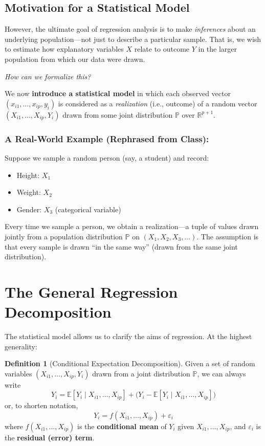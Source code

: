 \documentclass[11pt]{article}
\theoremstyle{definition}
\newtheorem{definition}{Definition}[section]
\theoremstyle{plain}
\theoremstyle{definition}
\begin{document}
\subsection{Motivation for a Statistical Model}

However, the ultimate goal of regression analysis is to make \emph{inferences} about an underlying population—not just to describe a particular sample. That is, we wish to estimate how explanatory variables $X$ relate to outcome $Y$ in the larger population from which our data were drawn.

\vspace{1em}
\textit{How can we formalize this?}

We now \textbf{introduce a statistical model} in which each observed vector $(x_{i1},\ldots,x_{ip}, y_i)$ is considered as a \emph{realization} (i.e., outcome) of a random vector $(X_{i1},\ldots,X_{ip}, Y_i)$ drawn from some joint distribution $\mathbb{P}$ over $\mathbb{R}^{p+1}$.

\subsubsection*{A Real-World Example (Rephrased from Class):}

Suppose we sample a random person (say, a student) and record:
\begin{itemize}
    \item Height: $X_1$
    \item Weight: $X_2$
    \item Gender: $X_3$ (categorical variable)
\end{itemize}
Every time we sample a person, we obtain a realization—a tuple of values drawn jointly from a population distribution $\mathbb{P}$ on $(X_1,X_2,X_3,\ldots)$. The assumption is that every sample is drawn ``in the same way'' (drawn from the same joint distribution).

\section{The General Regression Decomposition}

The statistical model allows us to clarify the aims of regression. At the highest generality:

\begin{definition}[Conditional Expectation Decomposition]
Given a set of random variables $(X_{i1}, \ldots, X_{ip}, Y_i)$ drawn from a joint distribution $\mathbb{P}$, we can always write
\[
Y_i = \mathbb{E}[Y_i \mid X_{i1},\ldots,X_{ip}] + \big(Y_i - \mathbb{E}[Y_i \mid X_{i1},\ldots,X_{ip}]\big)
\]
or, to shorten notation,
\[
Y_i = f(X_{i1},\ldots,X_{ip}) + \varepsilon_i
\]
where $f(X_{i1}, ..., X_{ip})$ is the \textbf{conditional mean} of $Y_i$ given $X_{i1}, ..., X_{ip}$, and $\varepsilon_i$ is the \textbf{residual (error) term}.
\end{definition}
\end{document}
